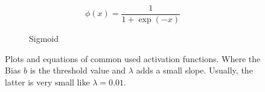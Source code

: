 \begin{figure}
	\begin{subfigure}{.5\textwidth}
		\centering
		
		\begin{equation*}
		\phi(x) = \frac{1}{1+\exp(-x)}
		\end{equation*}
		\caption{Sigmoid}
		\label{fig:sigmoid-activation}
	\end{subfigure}
	\caption[Common activation functions]{Plots and equations of common used activation functions. Where the Bias $b$ is the threshold value and $\lambda$ adds a small slope. Usually, the latter is very small like $\lambda=0.01$.}
	\label{fig:activation-functions}
\end{figure}